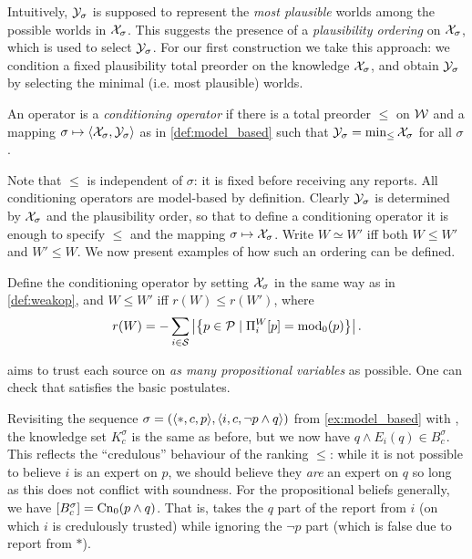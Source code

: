 Intuitively, $\mathcal{Y}_\sigma$ is supposed to represent the \emph{most
plausible} worlds among the possible worlds in $\mathcal{X}_\sigma$. This suggests the
presence of a \emph{plausibility ordering} on $\mathcal{X}_\sigma$, which is used to
select $\mathcal{Y}_\sigma$.
%
For our first construction we take this approach: we condition a fixed
plausibility total preorder\footnotemark{} on the knowledge $\mathcal{X}_\sigma$, and
obtain $\mathcal{Y}_\sigma$ by selecting the minimal (i.e. most plausible) worlds.

\begin{definition}
\label{def:conditioning_operator}
An operator is a \emph{conditioning operator} if there is a total
preorder $\le$ on $\mathcal{W}$ and a mapping $\sigma \mapsto \langle {\mathcal{X}_\sigma,
\mathcal{Y}_\sigma} \rangle$ as in \cref{def:model_based} such that
$
    \mathcal{Y}_\sigma = \min_{\le}{\mathcal{X}_\sigma}
$
for all $\sigma$.
\end{definition}

Note that $\le$ is independent of $\sigma$: it is fixed before receiving any
reports. All conditioning operators are model-based by definition. Clearly
$\mathcal{Y}_\sigma$ is determined by $\mathcal{X}_\sigma$ and the plausibility order, so that to
define a conditioning operator it is enough to specify $\le$ and the mapping
$\sigma \mapsto \mathcal{X}_\sigma$.
%
Write $W \simeq W'$ iff both $W \le W'$ and $W' \le W$.
%
We now present examples of how such an ordering can be defined.

\begin{definition}
    \label{def:varbasedcond}
    Define the conditioning operator \varbasedcond{} by setting
    $\mathcal{X}_\sigma$ in the same way as \weakop{} in \cref{def:weakop}, and $W \le
    W'$ iff $r(W) \le r(W')$, where
    \[
        r(W) = - \sum_{i \in \mathcal{S}}\left|\left\{
            p \in \mathcal{P}
            \mid
            \Pi^W_i[p] = \operatorname{mod}_0(p)
        \right\}\right|.
    \]
\end{definition}

\varbasedcond{} aims to trust each source on \emph{as many propositional
variables} as possible. One can check that \varbasedcond{} satisfies the
basic postulates.

\begin{example}
    \label{ex:conditioning_operator}
    Revisiting the sequence
    $
        \sigma
        = (\langle {\ast, c, p} \rangle, \langle {i, c, \neg p \land q} \rangle)
    $
    from \cref{ex:model_based} with \varbasedcond{}, the knowledge set
    $K^\sigma_c$ is the same as before, but we now have $q \land E_i(q) \in
    B^\sigma_c$. This reflects the ``credulous'' behaviour of the ranking
    $\le$: while it is not possible to believe $i$ is an expert on $p$, we
    should believe they \emph{are} an expert on $q$ so long as this does not
    conflict with soundness. For the propositional beliefs generally, we have
    $\left[{B^\sigma_c}\right] = \operatorname{Cn}_0(p \land q)$. That is, \varbasedcond{} takes
    the $q$ part of the report from $i$ (on which $i$ is credulously trusted)
    while ignoring the $\neg p$ part (which is false due to report from
    $\ast$).

\end{example}

